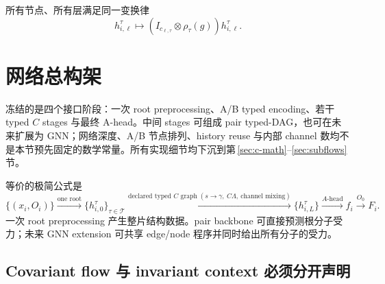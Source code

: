 \documentclass[11pt,a4paper,fontset=fandol]{ctexart}
\begin{document}
所有节点、所有层满足同一变换律
\begin{equation}
  h_{i,\ell}^{\tau}\longmapsto
  (I_{c_{\ell,\tau}}\otimes\rho_\tau(g))h_{i,\ell}^{\tau}.
  \label{eq:hidden-law}
\end{equation}

\section{网络总构架}

冻结的是四个接口阶段：一次 root preprocessing、A/B typed encoding、若干 typed $C$ stages 与最终 A-head。中间 stages 可组成 pair typed-DAG，也可在未来扩展为 GNN；网络深度、A/B 节点排列、history reuse 与内部 channel 数均不是本节预先固定的数学常量。所有实现细节均下沉到第\,\ref{sec:c-math}--\ref{sec:subflows} 节。

\begin{center}
\end{center}

等价的极简公式是
\begin{equation}
\{(x_i,O_i)\}
\xrightarrow{\text{one root}}
\{h_{i,0}^{\tau}\}_{\tau\in\mathscr T}
\xrightarrow{\text{declared typed }C\text{ graph}\;(s\to\gamma,\ C\Lambda,\ \text{channel mixing})}
\{h_{i,L}^{\tau}\}
\xrightarrow{A\text{-head}}
f_i
\xrightarrow{O_0}
F_i.
\label{eq:main-flow}
\end{equation}
一次 root preprocessing 产生整片结构数据。pair backbone 可直接预测根分子受力；未来 GNN extension 可共享 edge/node 程序并同时给出所有分子的受力。

\subsection{Covariant flow 与 invariant context 必须分开声明}
\end{document}
